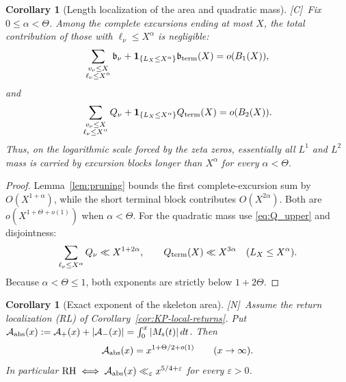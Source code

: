 \documentclass[11pt]{amsart}
\numberwithin{equation}{section}
\theoremstyle{plain}
\newtheorem{corollary}[theorem]{Corollary}
\theoremstyle{definition}
\theoremstyle{remark}
\newcommand{\Ms}{M_{\mathrm{s}}}
\newcommand{\Ap}{\mathcal{A}_{+}}
\newcommand{\Am}{\mathcal{A}_{-}}
\newcommand{\eps}{\varepsilon}
\newcommand{\tagN}{\textup{[N]}}
\newcommand{\tagC}{\textup{[C]}}
\begin{document}
\begin{corollary}[Length localization of the area and quadratic mass]
\label{cor:pintz-length-localization}
\tagC\ Fix $0\le\alpha<\Theta$.  Among the complete excursions ending at most $X$,
the total contribution of those with $\ell_\nu\le X^\alpha$ is negligible:
\[
 \sum_{\substack{v_\nu\le X\\ \ell_\nu\le X^\alpha}}\mathfrak b_\nu
 +\mathbf 1_{\{L_X\le X^\alpha\}}\mathfrak b_{\rm term}(X)
 =o(B_1(X)),
\]
and
\[
 \sum_{\substack{v_\nu\le X\\ \ell_\nu\le X^\alpha}}Q_\nu
 +\mathbf 1_{\{L_X\le X^\alpha\}}Q_{\rm term}(X)
 =o(B_2(X)).
\]
Thus, on the logarithmic scale forced by the zeta zeros, essentially all
$L^1$ and $L^2$ mass is carried by excursion blocks longer than
$X^\alpha$ for every $\alpha<\Theta$.
\end{corollary}

\begin{proof}
Lemma~\ref{lem:pruning} bounds the first complete-excursion sum by
$O(X^{1+\alpha})$, while the short terminal block contributes
$O(X^{2\alpha})$.  Both are $o(X^{1+\Theta+o(1)})$ when $\alpha<\Theta$.
For the quadratic mass use \eqref{eq:Q_upper} and disjointness:
\[
 \sum_{\ell_\nu\le X^\alpha}Q_\nu\ll X^{1+2\alpha},
 \qquad
 Q_{\rm term}(X)\ll X^{3\alpha}
 \quad(L_X\le X^\alpha).
\]
Because $\alpha<\Theta\le1$, both exponents are strictly below
$1+2\Theta$.
\end{proof}


\begin{corollary}[Exact exponent of the skeleton area]
\label{cor:area-exponent}
\tagN\ Assume the return localization (RL) of
Corollary~\ref{cor:KP-local-returns}. Put $\mathcal A_{\rm abs}(x):=\Ap(x)+|\Am(x)|=\int_0^x|\Ms(t)|\,dt$. Then
\[
\mathcal A_{\rm abs}(x)=x^{1+\Theta/2+o(1)}\qquad(x\to\infty).
\]
In particular $\mathrm{RH}\iff\mathcal A_{\rm abs}(x)\ll_\eps x^{5/4+\eps}$
for every $\eps>0$.
\end{corollary}
\end{document}
